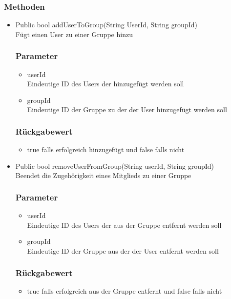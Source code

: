 \documentclass[a4paper]{scrreprt}
\begin{document}
\subsubsection*{Methoden}
\begin{addmargin}[25pt]{0pt}
\begin{itemize}

\item Public bool addUserToGroup(String UserId, String groupId)\\
	Fügt einen User zu einer Gruppe hinzu
	\subsubsection*{Parameter}
	\begin{itemize}
	\item userId \\
		Eindeutige ID des Users der hinzugefügt werden soll
	\item groupId \\
		Eindeutige ID der Gruppe zu der der User hinzugefügt werden soll
	\end{itemize}
	\subsubsection*{Rückgabewert}
	\begin{itemize}
	\item true falls erfolgreich hinzugefügt und false falls nicht
	\end{itemize}
	
\item Public bool removeUserFromGroup(String userId, String groupId)\\
	Beendet die Zugehörigkeit eines Mitglieds zu einer Gruppe
	\subsubsection*{Parameter}
	\begin{itemize}
	\item userId \\
		Eindeutige ID des Users der aus der Gruppe entfernt werden soll
	\item groupId \\
		Eindeutige ID der Gruppe aus der der User entfernt werden soll
	\end{itemize}
	\subsubsection*{Rückgabewert}
	\begin{itemize}
	\item true falls erfolgreich aus der Gruppe entfernt und false falls nicht
	\end{itemize}
\end{itemize}
\end{addmargin}
\end{document}
